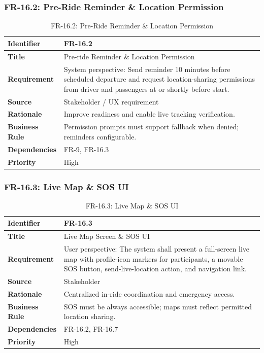 \subsubsection{FR-16.2: Pre-Ride Reminder \& Location Permission}

\begin{longtable}{|p{3cm}|p{12cm}|}
\caption{FR-16.2: Pre-Ride Reminder \& Location Permission}
\label{tab:fr-16-2} \\
\hline
\rowcolor{lightgray!30}
\textbf{Identifier} & FR-16.2 \\
\hline
\textbf{Title} & Pre-ride Reminder \& Location Permission \\
\hline
\textbf{Requirement} & System perspective: Send reminder 10 minutes before scheduled departure and request location-sharing permissions from driver and passengers at or shortly before start. \\
\hline
\textbf{Source} & Stakeholder / UX requirement \\
\hline
\textbf{Rationale} & Improve readiness and enable live tracking verification. \\
\hline
\textbf{Business Rule} & Permission prompts must support fallback when denied; reminders configurable. \\
\hline
\textbf{Dependencies} & FR-9, FR-16.3 \\
\hline
\textbf{Priority} & High \\
\hline
\end{longtable}

\subsubsection{FR-16.3: Live Map \& SOS UI}

\begin{longtable}{|p{3cm}|p{12cm}|}
\caption{FR-16.3: Live Map \& SOS UI}
\label{tab:fr-16-3} \\
\hline
\rowcolor{lightgray!30}
\textbf{Identifier} & FR-16.3 \\
\hline
\textbf{Title} & Live Map Screen \& SOS UI \\
\hline
\textbf{Requirement} & User perspective: The system shall present a full-screen live map with profile-icon markers for participants, a movable SOS button, send-live-location action, and navigation link. \\
\hline
\textbf{Source} & Stakeholder \\
\hline
\textbf{Rationale} & Centralized in-ride coordination and emergency access. \\
\hline
\textbf{Business Rule} & SOS must be always accessible; maps must reflect permitted location sharing. \\
\hline
\textbf{Dependencies} & FR-16.2, FR-16.7 \\
\hline
\textbf{Priority} & High \\
\hline
\end{longtable}

